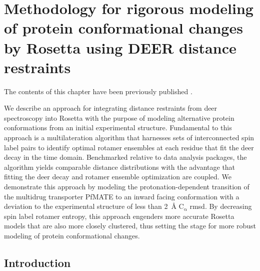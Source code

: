 \clearpage %

\chapter{Methodology for rigorous modeling of protein conformational changes by Rosetta using DEER distance restraints}\label{ch:multilateration}

The contents of this chapter have been previously published \citep*{DelAlamo2021a}.

\bigskip

We describe an approach for integrating distance restraints from \gls{deer} spectroscopy into Rosetta with the purpose of modeling alternative protein conformations from an initial experimental structure. Fundamental to this approach is a multilateration algorithm that harnesses sets of interconnected spin label pairs to identify optimal rotamer ensembles at each residue that fit the \gls{deer} decay in the time domain. Benchmarked relative to data analysis packages, the algorithm yields comparable distance distributions with the advantage that fitting the \gls{deer} decay and rotamer ensemble optimization are coupled. We demonstrate this approach by modeling the protonation-dependent transition of the multidrug transporter PfMATE to an inward facing conformation with a deviation to the experimental structure of less than \SI{2}{\angstrom} $\mathrm{C_{\upalpha}}$ \gls{rmsd}. By decreasing spin label rotamer entropy, this approach engenders more accurate Rosetta models that are also more closely clustered, thus setting the stage for more robust modeling of protein conformational changes.

\section{Introduction}\label{sec:multilateration_main_intro}

